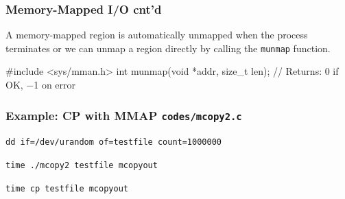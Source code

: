 \documentclass[newPxFont,sthlmFooter,nooffset]{beamer}
\begin{document}
\begin{frame}[t, fragile]
  \frametitle{Memory-Mapped I/O cnt'd}
A memory-mapped region is automatically unmapped when the process terminates or we can unmap a region directly by calling the \texttt{munmap} function.
\begin{codedef}
#include <sys/mman.h>
int munmap(void *addr, size_t len);
// Returns: 0 if OK, −1 on error
\end{codedef}


\end{frame}


\begin{frame}
  \frametitle{Example: CP with MMAP \texttt{codes/mcopy2.c}}
      

\texttt{dd if=/dev/urandom of=testfile count=1000000}

\texttt{time ./mcopy2 testfile mcopyout}

\texttt{time cp testfile mcopyout}
\end{frame}

\end{document}
